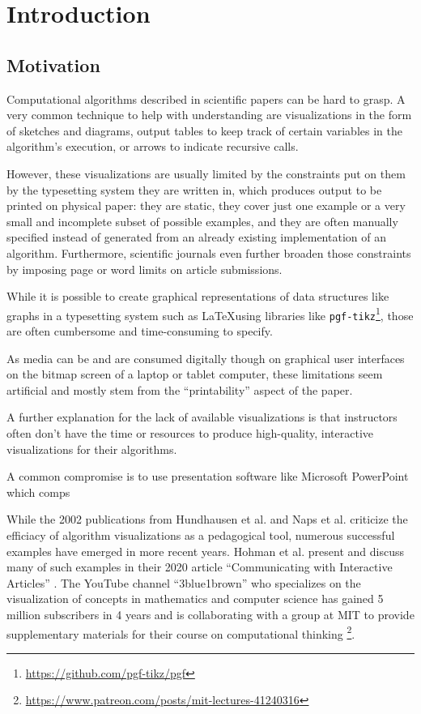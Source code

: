 \section{Introduction}

\subsection{Motivation}

Computational algorithms described in scientific papers can be hard to grasp. A very common technique to help with understanding are visualizations in the form of sketches and diagrams, output tables to keep track of certain variables in the algorithm's execution, or arrows to indicate recursive calls.

However, these visualizations are usually limited by the constraints put on them by the typesetting system they are written in, which produces output to be printed on physical paper: they are static, they cover just one example or a very small and incomplete subset of possible examples, and they are often manually specified instead of generated from an already existing implementation of an algorithm. Furthermore, scientific journals even further broaden those constraints by imposing page or word limits on article submissions.

While it is possible to create graphical representations of data structures like graphs in a typesetting system such as \LaTeX  using libraries like \texttt{pgf-tikz}\footnote{\url{https://github.com/pgf-tikz/pgf}}, those are often cumbersome and time-consuming  to specify.


As media can be and are consumed digitally though on graphical user interfaces on the bitmap screen of a laptop or tablet computer, these limitations seem artificial and mostly stem from the ``printability'' aspect of the paper.


A further explanation for the lack of available visualizations is that instructors often don't have the time or resources to produce high-quality, interactive visualizations for their algorithms.

A common compromise is to use presentation software like Microsoft PowerPoint which comps  

While the 2002 publications from Hundhausen et al. \cite{hundhausen2002meta} and Naps et al. \cite{naps2002exploring} criticize the efficiacy of algorithm visualizations as a pedagogical tool, numerous successful examples have emerged in more recent years.
Hohman et al. present and discuss many of such examples in their 2020 article ``Communicating with Interactive Articles'' \cite{hohman2020communicating}.
The YouTube channel ``3blue1brown'' who specializes on the visualization of concepts in mathematics and computer science has gained 5 million subscribers in 4 years and is collaborating with a group at MIT to provide supplementary materials for their course on computational thinking \footnote{\url{https://www.patreon.com/posts/mit-lectures-41240316}}.


